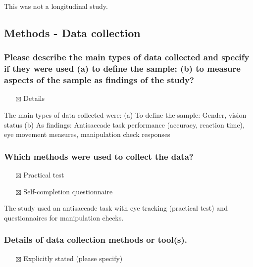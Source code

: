 \documentclass[
  doc, a4paper]{apa7}
\providecommand{\tightlist}{%
  \setlength{\itemsep}{0pt}\setlength{\parskip}{0pt}}
\begin{document}
This was not a longitudinal study.

\subsection{Methods - Data collection}\label{methods---data-collection}

\subsubsection{Please describe the main types of data collected and specify if they were used (a) to define the sample; (b) to measure aspects of the sample as findings of the study?}\label{please-describe-the-main-types-of-data-collected-and-specify-if-they-were-used-a-to-define-the-sample-b-to-measure-aspects-of-the-sample-as-findings-of-the-study}

\begin{itemize}
\tightlist
\item[$\boxtimes$]
  Details
\end{itemize}

The main types of data collected were:
(a) To define the sample: Gender, vision status
(b) As findings: Antisaccade task performance (accuracy, reaction time), eye movement measures, manipulation check responses

\subsubsection{Which methods were used to collect the data?}\label{which-methods-were-used-to-collect-the-data}

\begin{itemize}
\tightlist
\item[$\boxtimes$]
  Practical test
\item[$\boxtimes$]
  Self-completion questionnaire
\end{itemize}

The study used an antisaccade task with eye tracking (practical test) and questionnaires for manipulation checks.

\subsubsection{Details of data collection methods or tool(s).}\label{details-of-data-collection-methods-or-tools.}

\begin{itemize}
\tightlist
\item[$\boxtimes$]
  Explicitly stated (please specify)
\end{itemize}
\end{document}
